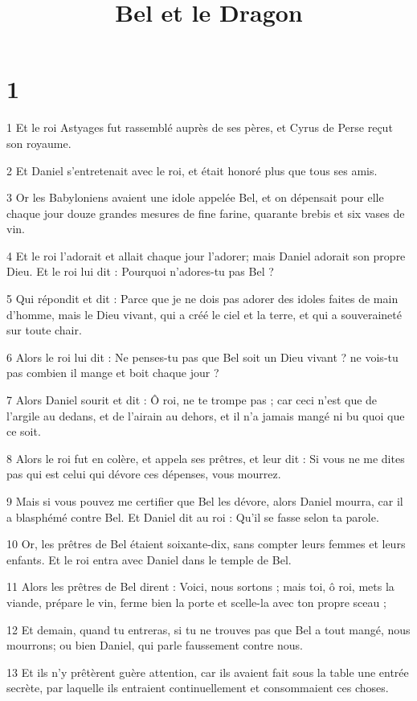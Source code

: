 

\title{Bel et le Dragon}

\chapter{1}

\par 1 Et le roi Astyages fut rassemblé auprès de ses pères, et Cyrus de Perse reçut son royaume.
\par 2 Et Daniel s'entretenait avec le roi, et était honoré plus que tous ses amis.
\par 3 Or les Babyloniens avaient une idole appelée Bel, et on dépensait pour elle chaque jour douze grandes mesures de fine farine, quarante brebis et six vases de vin.
\par 4 Et le roi l'adorait et allait chaque jour l'adorer; mais Daniel adorait son propre Dieu. Et le roi lui dit : Pourquoi n'adores-tu pas Bel ?
\par 5 Qui répondit et dit : Parce que je ne dois pas adorer des idoles faites de main d'homme, mais le Dieu vivant, qui a créé le ciel et la terre, et qui a souveraineté sur toute chair.
\par 6 Alors le roi lui dit : Ne penses-tu pas que Bel soit un Dieu vivant ? ne vois-tu pas combien il mange et boit chaque jour ?
\par 7 Alors Daniel sourit et dit : Ô roi, ne te trompe pas ; car ceci n'est que de l'argile au dedans, et de l'airain au dehors, et il n'a jamais mangé ni bu quoi que ce soit.
\par 8 Alors le roi fut en colère, et appela ses prêtres, et leur dit : Si vous ne me dites pas qui est celui qui dévore ces dépenses, vous mourrez.
\par 9 Mais si vous pouvez me certifier que Bel les dévore, alors Daniel mourra, car il a blasphémé contre Bel. Et Daniel dit au roi : Qu'il se fasse selon ta parole.
\par 10 Or, les prêtres de Bel étaient soixante-dix, sans compter leurs femmes et leurs enfants. Et le roi entra avec Daniel dans le temple de Bel.
\par 11 Alors les prêtres de Bel dirent : Voici, nous sortons ; mais toi, ô roi, mets la viande, prépare le vin, ferme bien la porte et scelle-la avec ton propre sceau ;
\par 12 Et demain, quand tu entreras, si tu ne trouves pas que Bel a tout mangé, nous mourrons; ou bien Daniel, qui parle faussement contre nous.
\par 13 Et ils n'y prêtèrent guère attention, car ils avaient fait sous la table une entrée secrète, par laquelle ils entraient continuellement et consommaient ces choses.
